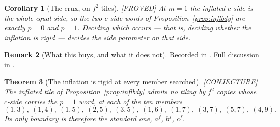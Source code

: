 \documentclass[11pt,reqno]{amsart}
\theoremstyle{plain}
\newtheorem{theorem}{Theorem}
\newtheorem{corollary}[theorem]{Corollary}
\theoremstyle{definition}
\newtheorem{remark}[theorem]{Remark}
\newcommand{\lab}[1]{\hfill\textnormal{\footnotesize\textsc{[#1]}}}
\begin{document}
\begin{corollary}[The crux, on $f^2$ tiles]\label{cor:inflcrux}\lab{PROVED}
At $m=1$ the inflated $c$-side is the whole equal side, so the two $c$-side words of
Proposition~\ref{prop:inflbdy} are exactly $p=0$ and $p=1$. Deciding which occurs --- that is,
deciding whether the inflation is rigid --- decides the side parameter on that side.
\end{corollary}

\begin{remark}[What this buys, and what it does not]\label{rem:inflvalue}
Recorded in \cite{Obstructions}. Full discussion in \cite{Obstructions}.
\end{remark}


\begin{theorem}[The inflation is rigid at every member searched]\label{thm:inflrigid}\lab{CONJECTURE}
The inflated tile of Proposition~\ref{prop:inflbdy} admits no tiling by $f^2$ copies whose $c$-side
carries the $p=1$ word, at each of the ten members
\[
(1,3),\ (1,4),\ (1,5),\ (2,5),\ (3,5),\ (1,6),\ (1,7),\ (3,7),\ (5,7),\ (4,9).
\]
Its only boundary is therefore the standard one, $a^f$, $b^f$, $c^f$.
\end{theorem}
\end{document}
